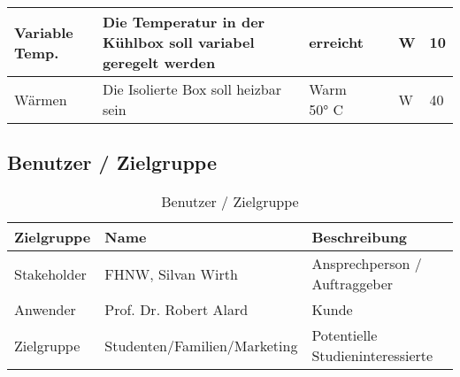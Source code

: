 \begin{table}[H]
{\begin{tabular}{|llllll|}
    \multicolumn{1}{|l|}{Variable Temp.}  & \multicolumn{1}{l|}{Die Temperatur in   der Kühlbox soll variabel geregelt werden}               & \multicolumn{1}{l|}{erreicht}         & \multicolumn{1}{l|}{}                   & \multicolumn{1}{l|}{W}                & 10                 \\ \hline
    \multicolumn{1}{|l|}{Wärmen}          & \multicolumn{1}{l|}{Die Isolierte Box   soll heizbar sein}                                       & \multicolumn{1}{l|}{Warm 50° C}       & \multicolumn{1}{l|}{}                   & \multicolumn{1}{l|}{W}                & 40                 \\ \hline
    \end{tabular}%
    }
    \end{table}

\subsection{Benutzer / Zielgruppe}
\begin{table}[H]
    \centering
    \caption{Benutzer / Zielgruppe}
    \label{tab:Zielgruppe}
    \begin{tabular}{|l|l|l|}
    \hline
    \rowcolor[HTML]{E0E0E0} 
    \textbf{Zielgruppe} & \textbf{Name}                & \textbf{Beschreibung}            \\ \hline
    Stakeholder         & FHNW, Silvan Wirth           & Ansprechperson / Auftraggeber    \\ \hline
    Anwender            & Prof. Dr. Robert   Alard     & Kunde                            \\ \hline
    Zielgruppe          & Studenten/Familien/Marketing & Potentielle Studieninteressierte \\ \hline
    \end{tabular}
    \end{table}
